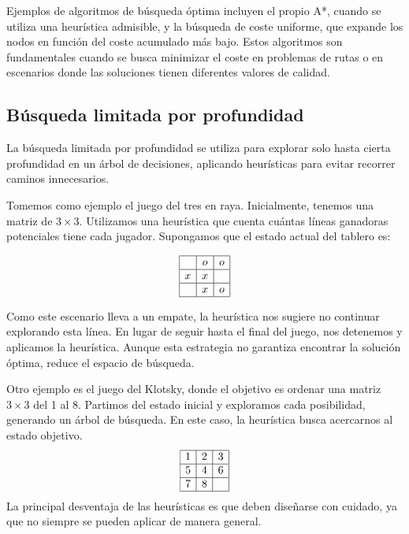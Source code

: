 \documentclass[tikz,11pt,fleqn]{book} %
\begin{document}
Ejemplos de algoritmos de búsqueda óptima incluyen el propio A*, cuando se utiliza una heurística admisible, y la búsqueda de coste uniforme, que expande los nodos en función del coste acumulado más bajo. Estos algoritmos son fundamentales cuando se busca minimizar el coste en problemas de rutas o en escenarios donde las soluciones tienen diferentes valores de calidad.


\subsection{Búsqueda limitada por profundidad}

La búsqueda limitada por profundidad se utiliza para explorar solo hasta cierta profundidad en un árbol de decisiones, aplicando heurísticas para evitar recorrer caminos innecesarios.

Tomemos como ejemplo el juego del tres en raya. Inicialmente, tenemos una matriz de $3\times3$. Utilizamos una heurística que cuenta cuántas líneas ganadoras potenciales tiene cada jugador. Supongamos que el estado actual del tablero es:

$$
\begin{array}{|c|c|c|}
\hline
 & o & o \\
\hline
x & x &  \\
\hline
 & x & o \\
\hline
\end{array}
$$

Como este escenario lleva a un empate, la heurística nos sugiere no continuar explorando esta línea. En lugar de seguir hasta el final del juego, nos detenemos y aplicamos la heurística. Aunque esta estrategia no garantiza encontrar la solución óptima, reduce el espacio de búsqueda.

Otro ejemplo es el juego del Klotsky, donde el objetivo es ordenar una matriz $3\times3$ del 1 al 8. Partimos del estado inicial y exploramos cada posibilidad, generando un árbol de búsqueda. En este caso, la heurística busca acercarnos al estado objetivo.
$$
    \begin{array}{|c|c|c|}
    \hline
    1 & 2 & 3 \\
    \hline
    5 & 4 & 6 \\
    \hline
    7 & 8 &  \\
    \hline
    \end{array}
$$
La principal desventaja de las heurísticas es que deben diseñarse con cuidado, ya que no siempre se pueden aplicar de manera general.
\end{document}
